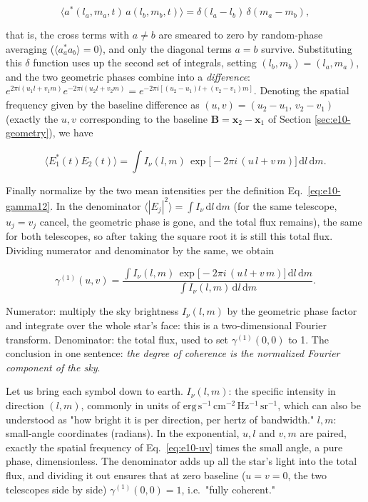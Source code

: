 \[
  \big\langle a^{\ast}(l_a,m_a,t)\,a(l_b,m_b,t)\big\rangle
  =\delta(l_a-l_b)\,\delta(m_a-m_b) ,
\]

that is, the cross terms with \(a\neq b\) are smeared to zero by random-phase averaging (\(\langle a_a^\ast a_b\rangle=0\)), and only the diagonal terms \(a=b\) survive. Substituting this \(\delta\) function uses up the second set of integrals, setting \((l_b,m_b)=(l_a,m_a)\), and the two geometric phases combine into a \emph{difference}: \(e^{2\pi i(u_1 l+v_1 m)}e^{-2\pi i(u_2 l+v_2 m)}=e^{-2\pi i[(u_2-u_1)l+(v_2-v_1)m]}\). Denoting the spatial frequency given by the baseline difference as \((u,v)=(u_2-u_1,\,v_2-v_1)\) (exactly the \(u,v\) corresponding to the baseline \(\bm B=\bm x_2-\bm x_1\) of Section \ref{sec:e10-geometry}), we have

\[
  \big\langle E_1^{\ast}(t)E_2(t)\big\rangle
  =\int I_\nu(l,m)\,\exp\!\big[-2\pi i\,(u\,l+v\,m)\big]\,\mathrm dl\,\mathrm dm .
\]

Finally normalize by the two mean intensities per the definition Eq.~\eqref{eq:e10-gamma12}. In the denominator \(\langle|E_j|^2\rangle=\int I_\nu\,\mathrm dl\,\mathrm dm\) (for the same telescope, \(u_j=v_j\) cancel, the geometric phase is gone, and the total flux remains), the same for both telescopes, so after taking the square root it is still this total flux. Dividing numerator and denominator by the same, we obtain

\begin{equation}
  \gamma^{(1)}(u,v)
  =\frac{\displaystyle\int I_\nu(l,m)\,\exp\!\big[-2\pi i\,(u\,l+v\,m)\big]\,\mathrm dl\,\mathrm dm}
        {\displaystyle\int I_\nu(l,m)\,\mathrm dl\,\mathrm dm}.
  \label{eq:e10-vcz}
\end{equation}
\begin{formulaexplain}
Numerator: multiply the sky brightness \(I_\nu(l,m)\) by the geometric phase factor and integrate over the whole star's face: this is a two-dimensional Fourier transform. Denominator: the total flux, used to set \(\gamma^{(1)}(0,0)\) to 1. The conclusion in one sentence: \emph{the degree of coherence is the normalized Fourier component of the sky}.
\end{formulaexplain}

Let us bring each symbol down to earth. \(I_\nu(l,m)\): the specific intensity in direction \((l,m)\), commonly in units of \(\mathrm{erg\,s^{-1}\,cm^{-2}\,Hz^{-1}\,sr^{-1}}\), which can also be understood as "how bright it is per direction, per hertz of bandwidth." \(l,m\): small-angle coordinates (radians). In the exponential, \(u,l\) and \(v,m\) are paired, exactly the spatial frequency of Eq.~\eqref{eq:e10-uv} times the small angle, a pure phase, dimensionless. The denominator adds up all the star's light into the total flux, and dividing it out ensures that at zero baseline (\(u=v=0\), the two telescopes side by side) \(\gamma^{(1)}(0,0)=1\), i.e.\ "fully coherent."

